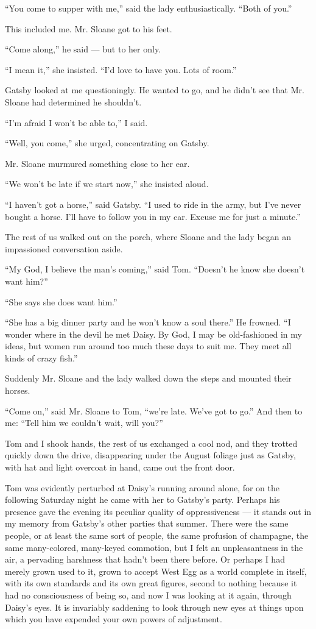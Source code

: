\documentclass{znotebook}
\begin{document}
``You come to supper with me,'' said the lady enthusiastically. ``Both of you.''

This included me. Mr. Sloane got to his feet.

``Come along,'' he said — but to her only.

``I mean it,'' she insisted. ``I'd love to have you. Lots of room.''

Gatsby looked at me questioningly. He wanted to go, and he didn't see that Mr. Sloane had determined he shouldn't.

``I'm afraid I won't be able to,'' I said.

``Well, you come,'' she urged, concentrating on Gatsby.

Mr. Sloane murmured something close to her ear.

``We won't be late if we start now,'' she insisted aloud.

``I haven't got a horse,'' said Gatsby. ``I used to ride in the army, but I've never bought a horse. I'll have to follow you in my car. Excuse me for just a minute.''

The rest of us walked out on the porch, where Sloane and the lady began an impassioned conversation aside.

``My God, I believe the man's coming,'' said Tom. ``Doesn't he know she doesn't want him?''

``She says she does want him.''

``She has a big dinner party and he won't know a soul there.'' He frowned. ``I wonder where in the devil he met Daisy. By God, I may be old-fashioned in my ideas, but women run around too much these days to suit me. They meet all kinds of crazy fish.''

Suddenly Mr. Sloane and the lady walked down the steps and mounted their horses.

``Come on,'' said Mr. Sloane to Tom, ``we're late. We've got to go.'' And then to me: ``Tell him we couldn't wait, will you?''

Tom and I shook hands, the rest of us exchanged a cool nod, and they trotted quickly down the drive, disappearing under the August foliage just as Gatsby, with hat and light overcoat in hand, came out the front door.

Tom was evidently perturbed at Daisy's running around alone, for on the following Saturday night he came with her to Gatsby's party. Perhaps his presence gave the evening its peculiar quality of oppressiveness — it stands out in my memory from Gatsby's other parties that summer. There were the same people, or at least the same sort of people, the same profusion of champagne, the same many-colored, many-keyed commotion, but I felt an unpleasantness in the air, a pervading harshness that hadn't been there before. Or perhaps I had merely grown used to it, grown to accept West Egg as a world complete in itself, with its own standards and its own great figures, second to nothing because it had no consciousness of being so, and now I was looking at it again, through Daisy's eyes. It is invariably saddening to look through new eyes at things upon which you have expended your own powers of adjustment.
\end{document}

